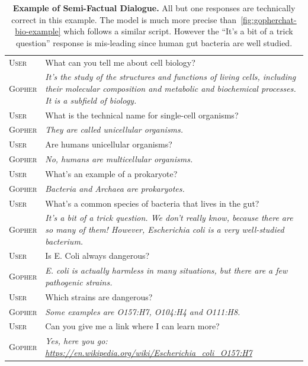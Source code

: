 \documentclass[11pt, a4paper, logo, internal, copyright, nonumbering]{deepmind}
\begin{document}
\begin{table}[H]
    \centering
    \begin{tabular}{p{2.5cm}p{12.5cm}}
    \toprule
{\small \textsc{User}} & {\small What can you tell me about cell biology?} \\
{\small \textsc{Gopher}} & {\small \textit{It's the study of the structures and functions of living cells, including their molecular composition and metabolic and biochemical processes. It is a subfield of biology.}} \\
{\small \textsc{User}} & {\small What is the technical name for single-cell organisms?} \\
{\small \textsc{Gopher}} & {\small \textit{They are called unicellular organisms. }} \\
{\small \textsc{User}} & {\small Are humans unicellular organisms?} \\
{\small \textsc{Gopher}} & {\small \textit{No, humans are multicellular organisms.}} \\
{\small \textsc{User}} & {\small What's an example of a prokaryote? } \\
{\small \textsc{Gopher}} & {\small \textit{Bacteria and Archaea are prokaryotes.}} \\
{\small \textsc{User}} & {\small What's a common species of bacteria that lives in the gut? } \\
{\small \textsc{Gopher}} & {\small \textit{It's a bit of a trick question. We don't really know, because there are so many of them! However, Escherichia coli is a very well-studied bacterium.}} \\
{\small \textsc{User}} & {\small Is E. Coli always dangerous? } \\
{\small \textsc{Gopher}} & {\small \textit{E. coli is actually harmless in many situations, but there are a few pathogenic strains. }} \\
{\small \textsc{User}} & {\small Which strains are dangerous? } \\
{\small \textsc{Gopher}} & {\small \textit{Some examples are O157:H7, O104:H4 and O111:H8.}} \\
{\small \textsc{User}} & {\small Can you give me a link where I can learn more? } \\
{\small \textsc{Gopher}} & {\small \textit{Yes, here you go: \newline \href{https://en.wikipedia.org/wiki/Escherichia\_coli\_O157:H7}{https://en.wikipedia.org/wiki/Escherichia\_coli\_O157:H7}}} \\
    \bottomrule
    \end{tabular}
    \caption{\textbf{Example of Semi-Factual Dialogue.} All but one responses are technically correct in this example. The model is much more precise than~\autoref{fig:gopherchat-bio-example} which follows a similar script. However the ``It's a bit of a trick question'' response is mis-leading since human gut bacteria are well studied.}
    \label{fig:gopherchat-alternate-bio-example}
\end{table}
\end{document}
